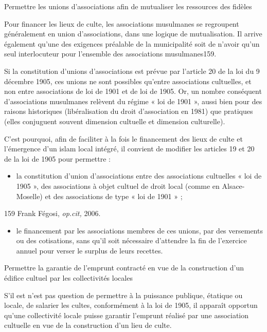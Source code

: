 Permettre les unions d'associations afin de mutualiser les ressources
des fidèles


Pour financer les lieux de culte, les associations musulmanes se
regroupent généralement en union d'associations, dans une logique de
mutualisation. Il arrive également qu'une des exigences préalable de la
municipalité soit de n'avoir qu'un seul interlocuteur pour l'ensemble
des associations musulmanes159.

Si la constitution d'unions d'associations est prévue par l'article 20
de la loi du 9 décembre 1905, ces unions ne sont possibles qu'entre
associations cultuelles, et non entre associations de loi de 1901 et de
loi de 1905. Or, un nombre conséquent d'associations musulmanes relèvent
du régime « loi de 1901 », aussi bien pour des raisons historiques
(libéralisation du droit d'association en 1981) que pratiques (elles
conjuguent souvent dimension cultuelle et dimension culturelle).

C'est pourquoi, afin de faciliter à la fois le financement des lieux de
culte et l'émergence d'un islam local intégré, il convient de modifier
les articles 19 et 20 de la loi de 1905 pour permettre :


\begin{itemize}
\item
  la constitution d'union d'associations entre des associations
  cultuelles « loi de 1905 », des associations à objet cultuel de droit
  local (comme en Alsace-Moselle) et des associations de type « loi de
  1901 » ;
\end{itemize}


159 Frank Fégosi, \emph{op.cit,} 2006.




\begin{itemize}
\item
  le financement par les associations membres de ces unions, par des
  versements ou des cotisations, sans qu'il soit nécessaire d'attendre
  la fin de l'exercice annuel pour verser le surplus de leurs recettes.
\end{itemize}

Permettre la garantie de l'emprunt contracté en vue de la construction
d'un édifice cultuel par les collectivités locales

S'il est n'est pas question de permettre à la puissance publique,
étatique ou locale, de salarier les cultes, conformément à la loi de
1905, il apparaît opportun qu'une collectivité locale puisse garantir
l'emprunt réalisé par une association cultuelle en vue de la
construction d'un lieu de culte.


